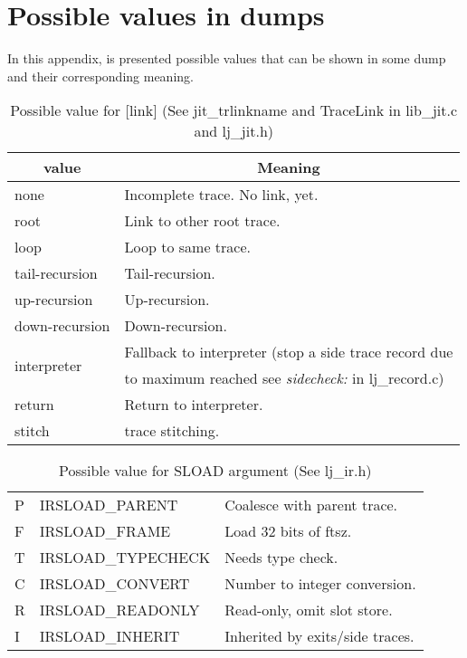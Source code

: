 
\chapter{Possible values in dumps}
\label{Apendix:dump-values}

In this appendix, is presented possible values that can be shown in some dump
and their corresponding meaning.

\begin{table}[H]
\centering
\caption{
  Possible value for [link] (See jit\_trlinkname and TraceLink in lib\_jit.c
  and lj\_jit.h)
}
\label{tab:dump-link}
\begin{tabular}{|l|l|}
\hline
\multicolumn{1}{|c|}{value} & \multicolumn{1}{c|}{Meaning}\\\hline
none                        & Incomplete trace. No link, yet.\\
root                        & Link to other root trace.\\
loop                        & Loop to same trace.\\
tail-recursion              & Tail-recursion.\\
up-recursion                & Up-recursion.\\
down-recursion              & Down-recursion.\\\hline
\multirow{2}{*}{interpreter}& Fallback to interpreter (stop a side trace record due\\
& to maximum reached see \emph{sidecheck:} in lj\_record.c)\\\hline
return                      & Return to interpreter.\\
stitch                      & trace stitching.\\\hline
\end{tabular}
\end{table}

\begin{table}[H]
\centering
\caption{
  Possible value for SLOAD argument (See lj\_ir.h)
}
\label{tab:dump-sload}
\begin{tabular}{|l|l|l|}
\hline
P & IRSLOAD\_PARENT    & Coalesce with parent trace.\\
F & IRSLOAD\_FRAME     & Load 32 bits of ftsz.\\
T & IRSLOAD\_TYPECHECK & Needs type check.\\
C & IRSLOAD\_CONVERT   & Number to integer conversion.\\
R & IRSLOAD\_READONLY  & Read-only, omit slot store.\\
I & IRSLOAD\_INHERIT   & Inherited by exits/side traces.\\
\hline
\end{tabular}
\end{table}

